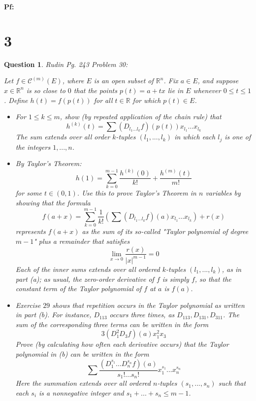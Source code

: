 \documentclass{article}
\newtheorem{question}{Question}
\begin{document}
\textbf{Pf:}

\break

\section*{3}
\begin{myBox}[]{}
    \begin{question}
        Rudin Pg. 243 Problem 30:

        Let $f\in \mathcal{C}^{(m)}(E)$, where $E$ is an open subset of $\mathbb{R}^n$. Fix $a\in E$, and suppose $x\in\mathbb{R}^n$ is so close to $0$ that the points $p(t)=a+tx$ lie in $E$ whenever $0\leq t\leq 1$. Define $h(t)=f(p(t))$ for all $t\in\mathbb{R}$ for which $p(t)\in E$.
        \begin{itemize}
            \item[(a)] For $1\leq k\leq m$, show (by repeated application of the chain rule) that 
            $$h^{(k)}(t)=\sum (D_{l_1...l_k}f)(p(t))x_{l_1}...x_{l_k}$$
            The sum extends over all order $k$-tuples $(l_1,...,l_k)$ in which each $l_j$ is one of the integers $1,...,n$.
            \item[(b)] By Taylor's Theorem:
            $$h(1)=\sum_{k=0}^{m-1}\frac{h^{(k)}(0)}{k!}+\frac{h^{(m)}(t)}{m!}$$
            for some $t\in (0,1)$. Use this to prove Taylor's Theorem in $n$ variables by showing that the formula 
            $$f(a+x)=\sum_{k=0}^{m-1}\frac{1}{k!}\left(\sum(D_{l_1...l_k}f)(a)x_{l_1}...x_{l_k}\right)+r(x)$$
            represents $f(a+x)$ as the sum of its so-called "Taylor polynomial of degree $m-1$" plus a remainder that satisfies 
            $$\lim_{x\rightarrow 0}\frac{r(x)}{|x|^{m-1}}=0$$
            Each of the inner sums extends over all ordered $k$-tuples $(l_1,...,l_k)$, as in part (a); as usual, the zero-order derivative of $f$ is simply $f$, so that the constant term of the Taylor polynomial of $f$ at $a$ is $f(a)$.
            \item[(c)] Exercise $29$ shows that repetition occurs in the Taylor polynomial as written in part (b). For instance, $D_{113}$ occurs three times, as $D_{113}, D_{131}, D_{311}$. The sum of the corresponding three terms can be written in the form 
            $$3(D_1^2D_3f)(a)x_1^2x_3$$
            Prove (by calculating how often each derivative occurs) that the Taylor polynomial in (b) can be written in the form 
            $$\sum\frac{(D_1^{s_1}...D_n^{s_n}f)(a)}{s_1!...s_n!}x_1^{s_1}...x_n^{s_n}$$
            Here the summation extends over all ordered $n$-tuples $(s_1,...,s_n)$ such that each $s_i$ is a nonnegative integer and $s_1+...+s_n\leq m-1$.
        \end{itemize}
    \end{question}
\end{myBox}
\end{document}
